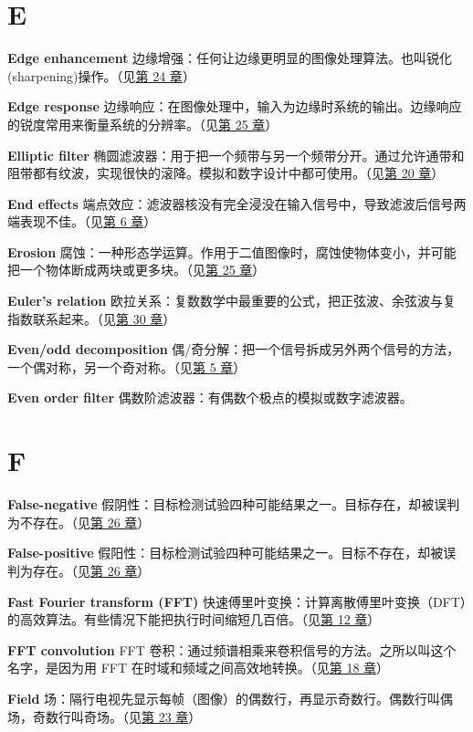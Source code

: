 \section{E}

\textbf{Edge enhancement}
边缘增强：任何让边缘更明显的图像处理算法。也叫锐化(sharpening)操作。（见\hyperref[ch-24]{第
24 章}）

\textbf{Edge response}
边缘响应：在图像处理中，输入为边缘时系统的输出。边缘响应的锐度常用来衡量系统的分辨率。（见\hyperref[ch-25]{第
25 章}）

\textbf{Elliptic filter}
椭圆滤波器：用于把一个频带与另一个频带分开。通过允许通带和阻带都有纹波，实现很快的滚降。模拟和数字设计中都可使用。（见\hyperref[ch-20]{第
20 章}）

\textbf{End effects}
端点效应：滤波器核没有完全浸没在输入信号中，导致滤波后信号两端表现不佳。（见\hyperref[ch-06]{第
6 章}）

\textbf{Erosion}
腐蚀：一种形态学运算。作用于二值图像时，腐蚀使物体变小，并可能把一个物体断成两块或更多块。（见\hyperref[ch-25]{第
25 章}）

\textbf{Euler's relation}
欧拉关系：复数数学中最重要的公式，把正弦波、余弦波与复指数联系起来。（见\hyperref[ch-30]{第
30 章}）

\textbf{Even/odd decomposition}
偶/奇分解：把一个信号拆成另外两个信号的方法，一个偶对称，另一个奇对称。（见\hyperref[ch-05]{第
5 章}）

\textbf{Even order filter}
偶数阶滤波器：有偶数个极点的模拟或数字滤波器。

\section{F}

\textbf{False-negative}
假阴性：目标检测试验四种可能结果之一。目标存在，却被误判为不存在。（见\hyperref[ch-26]{第
26 章}）

\textbf{False-positive}
假阳性：目标检测试验四种可能结果之一。目标不存在，却被误判为存在。（见\hyperref[ch-26]{第
26 章}）

\textbf{Fast Fourier transform (FFT)}
快速傅里叶变换：计算离散傅里叶变换（DFT）的高效算法。有些情况下能把执行时间缩短几百倍。（见\hyperref[ch-12]{第
12 章}）

\textbf{FFT convolution} FFT
卷积：通过频谱相乘来卷积信号的方法。之所以叫这个名字，是因为用 FFT
在时域和频域之间高效地转换。（见\hyperref[ch-18]{第 18 章}）

\textbf{Field}
场：隔行电视先显示每帧（图像）的偶数行，再显示奇数行。偶数行叫偶场，奇数行叫奇场。（见\hyperref[ch-23]{第
23 章}）

